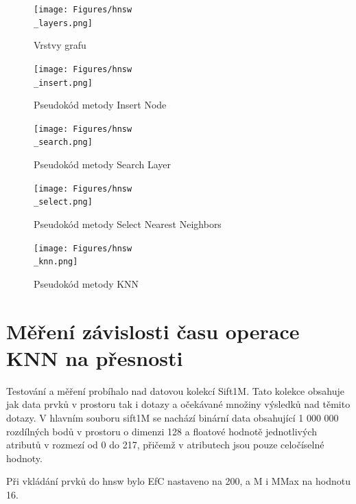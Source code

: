 \documentclass[czech,semestral,dept460,male,csharp,cpdeclaration]{diploma}
\begin{document}
		\begin{figure}
			\centering
			\texttt{[image: Figures/hnsw\\\_layers.png]}
			\caption{Vrstvy grafu}
			\label{hnsw_layers}
		\end{figure}
		
		\begin{figure}
			\centering
			\texttt{[image: Figures/hnsw\\\_insert.png]}
			\caption{Pseudokód metody Insert Node}
			\label{hnsw_insert}
		\end{figure}
		
		\begin{figure}
			\centering
			\texttt{[image: Figures/hnsw\\\_search.png]}
			\caption{Pseudokód metody Search Layer}
			\label{hnsw_search}
		\end{figure}
		
		\begin{figure}
			\centering
			\texttt{[image: Figures/hnsw\\\_select.png]}
			\caption{Pseudokód metody Select Nearest Neighbors}
			\label{hnsw_select}
		\end{figure}
		
		\begin{figure}
			\centering
			\texttt{[image: Figures/hnsw\\\_knn.png]}
			\caption{Pseudokód metody KNN}
			\label{hnsw_knn}
		\end{figure}
		
		\newpage
		
		\section{Měření závislosti času operace KNN na přesnosti}
		
		Testování a měření probíhalo nad datovou kolekcí Sift1M. Tato kolekce obsahuje jak data prvků v prostoru tak i dotazy a očekávané množiny výsledků nad těmito dotazy. V hlavním souboru sift1M se nachází binární data obsahující 1 000 000 rozdílných bodů v prostoru o dimenzi 128 a floatové hodnotě jednotlivých atributů v rozmezí od 0 do 217, přičemž v atributech jsou pouze celočíselné hodnoty.
		
		Při vkládání prvků do hnsw bylo EfC nastaveno na 200, a M i MMax na hodnotu 16.
		
\end{document}
